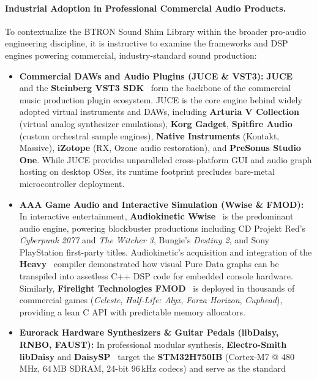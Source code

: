 \documentclass[10pt,journal,compsoc,twocolumn]{article}
\begin{document}
\paragraph{Industrial Adoption in Professional Commercial Audio Products.}
To contextualize the BTRON Sound Shim Library within the broader pro-audio
engineering discipline, it is instructive to examine the frameworks and DSP
engines powering commercial, industry-standard sound production:
\begin{itemize}[leftmargin=*]
    \item \textbf{Commercial DAWs and Audio Plugins (JUCE \& VST3):}
    \textbf{JUCE}~\cite{juce2004} and the \textbf{Steinberg VST3 SDK}~\cite{vst3sdk}
    form the backbone of the commercial music production plugin ecosystem.
    JUCE is the core engine behind widely adopted virtual instruments and DAWs,
    including \textbf{Arturia V Collection} (virtual analog synthesizer emulations),
    \textbf{Korg Gadget}, \textbf{Spitfire Audio} (custom orchestral sample engines),
    \textbf{Native Instruments} (Kontakt, Massive), \textbf{iZotope} (RX, Ozone audio
    restoration), and \textbf{PreSonus Studio One}. While JUCE provides unparalleled
    cross-platform GUI and audio graph hosting on desktop OSes, its runtime footprint
    precludes bare-metal microcontroller deployment.
    \item \textbf{AAA Game Audio and Interactive Simulation (Wwise \& FMOD):}
    In interactive entertainment, \textbf{Audiokinetic Wwise}~\cite{wwise2024} is the
    predominant audio engine, powering blockbuster productions including CD Projekt
    Red's \emph{Cyberpunk 2077} and \emph{The Witcher 3}, Bungie's \emph{Destiny 2},
    and Sony PlayStation first-party titles. Audiokinetic's acquisition and integration
    of the \textbf{Heavy}~\cite{heavy2015} compiler demonstrated how visual Pure
    Data graphs can be transpiled into assetless C++ DSP code for embedded console
    hardware. Similarly, \textbf{Firelight Technologies FMOD}~\cite{fmod2024} is
    deployed in thousands of commercial games (\emph{Celeste}, \emph{Half-Life: Alyx},
    \emph{Forza Horizon}, \emph{Cuphead}), providing a lean C API with predictable
    memory allocators.
    \item \textbf{Eurorack Hardware Synthesizers \& Guitar Pedals (libDaisy, RNBO, FAUST):}
    In professional modular synthesis, \textbf{Electro-Smith libDaisy} and
    \textbf{DaisySP}~\cite{libdaisy2020} target the \textbf{STM32H750IB} (Cortex-M7 @
    480\,MHz, 64\,MB SDRAM, 24-bit 96\,kHz codecs) and serve as the standard

\end{itemize}
\end{document}
